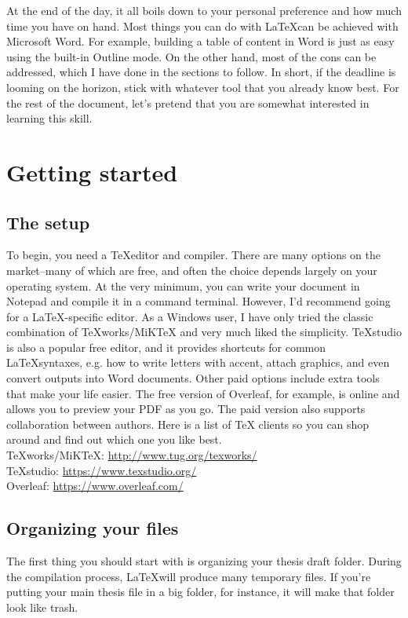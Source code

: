 \documentclass[12pt, letterpaper]{article}
\begin{document}
At the end of the day, it all boils down to your personal preference and how much time you have on hand. Most things you can do with \LaTeX can be achieved with Microsoft Word. For example, building a table of content in Word is just as easy using the built-in Outline mode. On the other hand, most of the cons can be addressed, which I have done in the sections to follow. In short, if the deadline is looming on the horizon, stick with whatever tool that you already know best. For the rest of the document, let's pretend that you are somewhat interested in learning this skill.

\section{Getting started}
\subsection{The setup}
To begin, you need a \TeX editor and compiler. There are many options on the market--many of which are free, and often the choice depends largely on your operating system. At the very minimum, you can write your document in Notepad and compile it in a command terminal. However, I'd recommend going for a \LaTeX-specific editor. As a Windows user, I have only tried the classic combination of TeXworks/MiKTeX and very much liked the simplicity. TeXstudio is also a popular free editor, and it provides shortcuts for common \LaTeX syntaxes, e.g. how to write letters with accent, attach graphics, and even convert outputs into Word documents. Other paid options include extra tools that make your life easier. The free version of Overleaf, for example, is online and allows you to preview your PDF as you go. The paid version also supports collaboration between authors. Here is a list of TeX clients so you can shop around and find out which one you like best.\\
TeXworks/MiKTeX: \href{http://www.tug.org/texworks/}{http://www.tug.org/texworks/}\\
TeXstudio: \href{https://www.texstudio.org/}{https://www.texstudio.org/}\\
Overleaf: \href{https://www.overleaf.com/}{https://www.overleaf.com/}

\subsection{Organizing your files}
The first thing you should start with is organizing your thesis draft folder. During the compilation process, \LaTeX will produce many temporary files. If you're putting your main thesis file in a big folder, for instance, it will make that folder look like trash. 
\end{document}

